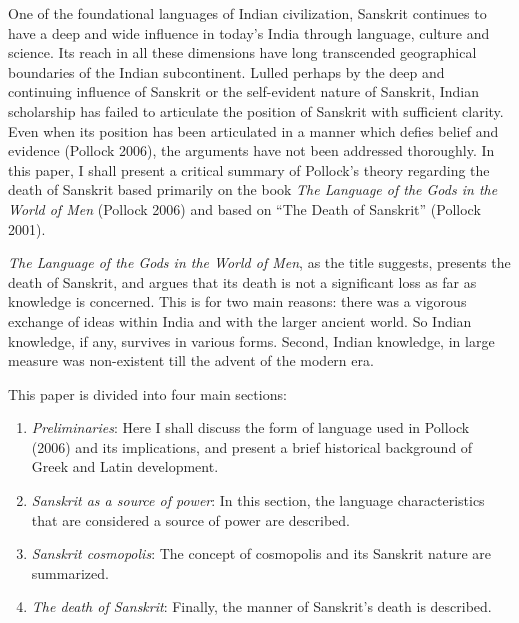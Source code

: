 One of the foundational languages of Indian civilization, Sanskrit continues to have a deep and wide influence in today’s India through language, culture and science. Its reach in all these dimensions have long transcended geographical boundaries of the Indian subcontinent. Lulled perhaps by the deep and continuing influence of Sanskrit or the self-evident nature of Sanskrit, Indian scholarship has failed to articulate the position of Sanskrit with sufficient clarity. Even when its position has been articulated in a manner which defies belief and evidence (Pollock 2006), the arguments have not been addressed thoroughly. In this paper, I shall present a critical summary of Pollock’s theory regarding the death of Sanskrit based primarily on the book {\sl The Language of the Gods in the World of Men} (Pollock 2006) and based on “The Death of Sanskrit” (Pollock 2001).

{\sl The Language of the Gods in the World of Men}, as the title suggests, presents the death of Sanskrit, and argues that its death is not a significant loss as far as knowledge is concerned. This is for two main reasons: there was a vigorous exchange of ideas within India and with the larger ancient world. So Indian knowledge, if any, survives in various forms. Second, Indian knowledge, in large measure was non-existent till the advent of the modern era.

This paper is divided into four main sections: 

\begin{enumerate}
\item {\sl Preliminaries}: Here I shall discuss the form of language used in Pollock (2006) and its implications, and present a brief historical background of Greek and Latin development.
\item  {\sl Sanskrit as a source of power}: In this section, the language characteristics that are considered a source of power are described. 
\item  {\sl Sanskrit cosmopolis}: The concept of cosmopolis and its Sanskrit nature are summarized.
\item  {\sl The death of Sanskrit}: Finally, the manner of Sanskrit’s death is described.
\end{enumerate}
\newpage

